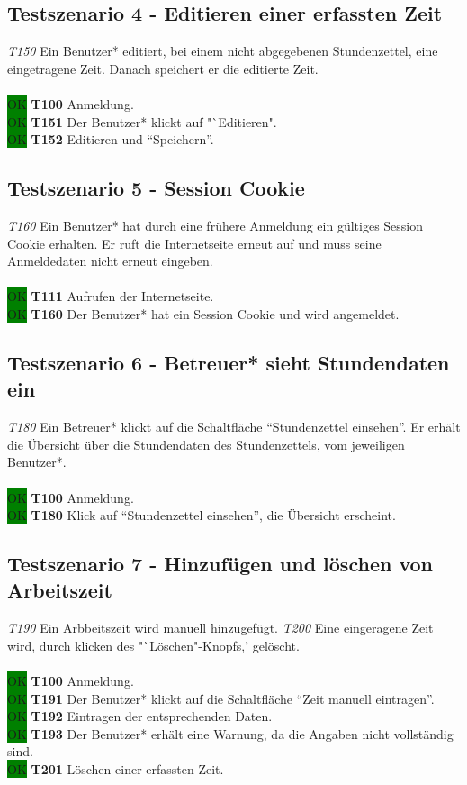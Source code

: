 \subsection{Testszenario 4 - Editieren einer erfassten Zeit}
\emph{T150} Ein Benutzer* editiert, bei einem nicht abgegebenen Stundenzettel, eine eingetragene Zeit. Danach speichert er die editierte Zeit.
\\\\
\colorbox{green}{OK} \textbf{T100} Anmeldung. \\
\colorbox{green}{OK} \textbf{T151} Der Benutzer* klickt auf "`Editieren". \\
\colorbox{green}{OK} \textbf{T152} Editieren und "`Speichern"'.

\subsection{Testszenario 5 - Session Cookie}
\emph{T160} Ein Benutzer* hat durch eine frühere Anmeldung ein gültiges Session Cookie erhalten. Er ruft die Internetseite erneut auf und muss seine Anmeldedaten nicht erneut eingeben.
\\\\
\colorbox{green}{OK} \textbf{T111} Aufrufen der Internetseite. \\
\colorbox{green}{OK} \textbf{T160} Der Benutzer* hat ein Session Cookie und wird angemeldet.

\subsection{Testszenario 6 - Betreuer* sieht Stundendaten ein}
\emph{T180} Ein Betreuer* klickt auf die Schaltfläche "`Stundenzettel einsehen"'. Er erhält die Übersicht über die Stundendaten des Stundenzettels, vom jeweiligen Benutzer*.
\\\\
\colorbox{green}{OK} \textbf{T100} Anmeldung. \\
\colorbox{green}{OK} \textbf{T180} Klick auf "`Stundenzettel einsehen"', die Übersicht erscheint.

\subsection{Testszenario 7 - Hinzufügen und löschen von Arbeitszeit}
\emph{T190} Ein Arbbeitszeit wird manuell hinzugefügt. \emph{T200} Eine eingeragene Zeit wird, durch klicken des "`Löschen"-Knopfs,' gelöscht.
\\\\
\colorbox{green}{OK} \textbf{T100} Anmeldung. \\
\colorbox{green}{OK} \textbf{T191} Der Benutzer* klickt auf die Schaltfläche "`Zeit manuell eintragen"'. \\
\colorbox{green}{OK} \textbf{T192} Eintragen der entsprechenden Daten. \\
\colorbox{green}{OK} \textbf{T193} Der Benutzer* erhält eine Warnung, da die Angaben nicht vollständig sind. \\
\colorbox{green}{OK} \textbf{T201} Löschen einer erfassten Zeit.

